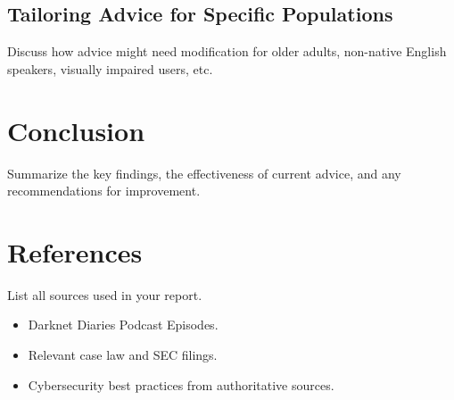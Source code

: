 \documentclass[11pt]{article}
\begin{document}
\subsection{Tailoring Advice for Specific Populations}
Discuss how advice might need modification for older adults, non-native English speakers, visually impaired users, etc.

\section{Conclusion}
Summarize the key findings, the effectiveness of current advice, and any recommendations for improvement.

\section{References}
List all sources used in your report.
\begin{itemize}
\item Darknet Diaries Podcast Episodes.
\item Relevant case law and SEC filings.
\item Cybersecurity best practices from authoritative sources.
\end{itemize}
\end{document}
